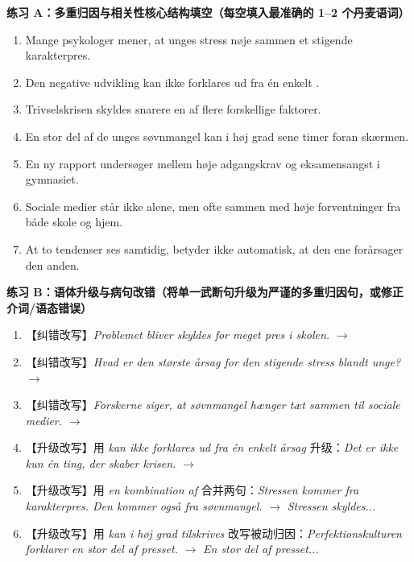 \textbf{练习 A：多重归因与相关性核心结构填空（每空填入最准确的 1--2 个丹麦语词）}
\begin{enumerate}
  \item Mange psykologer mener, at unges stress \underline{\hspace{2.2cm}} nøje sammen \underline{\hspace{2.2cm}} et stigende karakterpres.
  \item Den negative udvikling kan ikke forklares ud fra én enkelt \underline{\hspace{2.2cm}}.
  \item Trivselskrisen skyldes snarere en \underline{\hspace{2.2cm}} af flere forskellige faktorer.
  \item En stor del af de unges søvnmangel kan i høj grad \underline{\hspace{2.2cm}} sene timer foran skærmen.
  \item En ny rapport undersøger \underline{\hspace{2.2cm}} mellem høje adgangskrav og eksamensangst i gymnasiet.
  \item Sociale medier står ikke alene, men \underline{\hspace{2.2cm}} ofte sammen med høje forventninger fra både skole og hjem.
  \item At to tendenser ses samtidig, betyder \underline{\hspace{2.2cm}} ikke automatisk, at den ene forårsager den anden.
\end{enumerate}

\textbf{练习 B：语体升级与病句改错（将单一武断句升级为严谨的多重归因句，或修正介词/语态错误）}
\begin{enumerate}
  \item 【纠错改写】\textit{Problemet bliver skyldes for meget pres i skolen.} $\rightarrow$
  \item 【纠错改写】\textit{Hvad er den største årsag for den stigende stress blandt unge?} $\rightarrow$
  \item 【纠错改写】\textit{Forskerne siger, at søvnmangel hænger tæt sammen til sociale medier.} $\rightarrow$
  \item 【升级改写】用 \textit{kan ikke forklares ud fra én enkelt årsag} 升级：\textit{Det er ikke kun én ting, der skaber krisen.} $\rightarrow$
  \item 【升级改写】用 \textit{en kombination af} 合并两句：\textit{Stressen kommer fra karakterpres. Den kommer også fra søvnmangel.} $\rightarrow$ \textit{Stressen skyldes...}
  \item 【升级改写】用 \textit{kan i høj grad tilskrives} 改写被动归因：\textit{Perfektionskulturen forklarer en stor del af presset.} $\rightarrow$ \textit{En stor del af presset...}
\end{enumerate}

